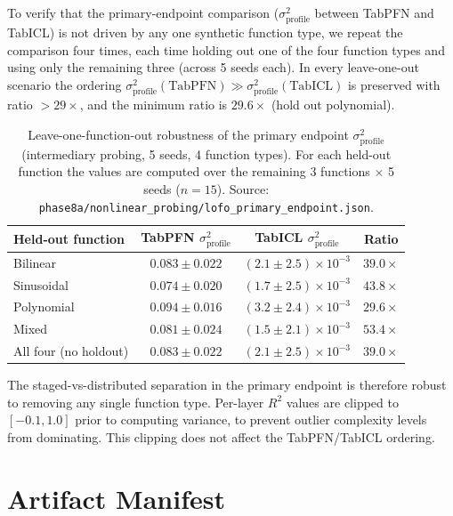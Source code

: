 \documentclass{article}
\begin{document}
To verify that the primary-endpoint comparison ($\sigma^2_\text{profile}$ between TabPFN and TabICL) is not driven by any one synthetic function type, we repeat the comparison four times, each time holding out one of the four function types and using only the remaining three (across 5 seeds each). In every leave-one-out scenario the ordering $\sigma^2_\text{profile}(\text{TabPFN}) \gg \sigma^2_\text{profile}(\text{TabICL})$ is preserved with ratio $> 29\times$, and the minimum ratio is $29.6\times$ (hold out polynomial).

\begin{table}[htbp]
\centering
\caption{Leave-one-function-out robustness of the primary endpoint $\sigma^2_\text{profile}$ (intermediary probing, 5 seeds, 4 function types). For each held-out function the values are computed over the remaining 3 functions $\times$ 5 seeds ($n{=}15$). Source: \texttt{phase8a/nonlinear\_probing/lofo\_primary\_endpoint.json}.}
\label{tab:lofo}
\small
\begin{tabular}{@{}l c c c@{}}
\toprule
Held-out function & TabPFN $\sigma^2_\text{profile}$ & TabICL $\sigma^2_\text{profile}$ & Ratio \\
\midrule
Bilinear  & $0.083 \pm 0.022$ & $(2.1 \pm 2.5)\times10^{-3}$ & $39.0\times$ \\
Sinusoidal & $0.074 \pm 0.020$ & $(1.7 \pm 2.5)\times10^{-3}$ & $43.8\times$ \\
Polynomial & $0.094 \pm 0.016$ & $(3.2 \pm 2.4)\times10^{-3}$ & $29.6\times$ \\
Mixed      & $0.081 \pm 0.024$ & $(1.5 \pm 2.1)\times10^{-3}$ & $53.4\times$ \\
\midrule
All four (no holdout) & $0.083 \pm 0.022$ & $(2.1 \pm 2.5)\times10^{-3}$ & $39.0\times$ \\
\bottomrule
\end{tabular}
\end{table}

\noindent The staged-vs-distributed separation in the primary endpoint is therefore robust to removing any single function type. Per-layer $R^2$ values are clipped to $[-0.1, 1.0]$ prior to computing variance, to prevent outlier complexity levels from dominating. This clipping does not affect the TabPFN/TabICL ordering.

\section{Artifact Manifest}
\label{app:manifest}
\end{document}
